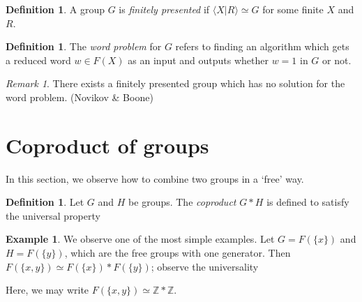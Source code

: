 \documentclass[12pt]{report}
\theoremstyle{plain}
\theoremstyle{remark}
\newtheorem*{remark}{Remark}
\theoremstyle{definition}
\newtheorem{definition}[theorem]{Definition}
\newtheorem{example}[theorem]{Example}
\newcommand{\Z}{\mathbb{Z}}
\begin{document}
\begin{definition}
    A group $G$ is \emph{finitely presented} if $\langle X|R\rangle\simeq G$ for some finite $X$ and $R$.
\end{definition}

\begin{definition}
    The \emph{word problem} for $G$ refers to finding an algorithm which gets a reduced word $w\in F(X)$ as an input and outputs whether $w=1$ in $G$ or not.
\end{definition}
\begin{remark}
    There exists a finitely presented group which has no solution for the word problem. (Novikov \& Boone)
\end{remark}


\clearpage
\section{Coproduct of groups}

In this section, we observe how to combine two groups in a `free' way.

\begin{definition}
    Let $G$ and $H$ be groups. The \emph{coproduct} $G*H$ is defined to satisfy the universal property
    \begin{figure}[H]
    \centering
    \end{figure}
\end{definition}

\begin{example}
    We observe one of the most simple examples. Let $G=F(\{x\})$ and $H=F(\{y\})$, which are the free groups with one generator. Then $F(\{x,y\})\simeq F(\{x\})*F(\{y\})$; observe the universality
    \begin{figure}[H]
    \centering
    \end{figure}
    \noindent
    Here, we may write $F(\{x,y\})\simeq \Z*\Z$.
\end{example}
\end{document}
